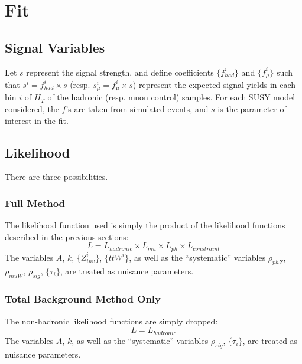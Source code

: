 \section{Fit}

\subsection{Signal Variables}
Let $s$ represent the signal strength, and define coefficients $\{f_{had}^{i}\}$ and $\{f_{\mu}^{i}\}$
such that $s^{i} = f_{had}^{i} \times s$ (resp. $s_{\mu}^{i} = f_{\mu}^{i} \times s$) represent the expected signal yields in each bin $i$ of $H_{T}$ of the
hadronic (resp. muon control) samples.  For each SUSY model considered, the $f$'s are taken from simulated events, and $s$ is the parameter of interest in the fit.

\subsection{Likelihood}
There are three possibilities.

\subsubsection{Full Method}
The likelihood function used is simply the product of the likelihood functions described in the previous sections:
\begin{equation}
L = L_{hadronic} \times L_{mu} \times L_{ph} \times L_{constraint}
\end{equation}
The variables $A$, $k$, $\{Z_{inv}^{i}\}$, $\{ttW^{i}\}$, as well as the ``systematic'' variables $\rho_{phZ}$, $\rho_{muW}$, $\rho_{sig}$, $\{\tau_i\}$,
are treated as nuisance parameters.

\subsubsection{Total Background Method Only}
The non-hadronic likelihood functions are simply dropped:
\begin{equation}
L = L_{hadronic}
\end{equation}
The variables $A$, $k$, as well as the ``systematic'' variables $\rho_{sig}$, $\{\tau_i\}$, are treated as nuisance parameters.

